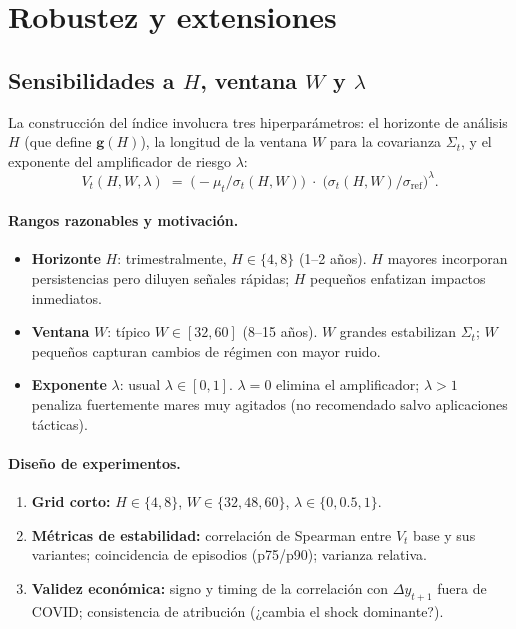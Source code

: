 \documentclass[11pt,a4paper]{article}
\newcommand{\1}{\mathbf{1}}
\newcommand{\vect}[1]{\boldsymbol{#1}}
\begin{document}
\section{Robustez y extensiones}

\subsection{Sensibilidades a \texorpdfstring{$H$}{H}, ventana \texorpdfstring{$W$}{W} y \texorpdfstring{$\lambda$}{lambda}}

La construcción del índice involucra tres hiperparámetros: el horizonte de análisis $H$ (que define $\vect{g}(H)$), la longitud de la ventana $W$ para la covarianza $\Sigma_t$, y el exponente del amplificador de riesgo $\lambda$:
\[
V_t(H,W,\lambda) \;=\; \Big(-\mu_t/\sigma_t(H,W)\Big)\;\cdot\;\Big(\sigma_t(H,W)/\sigma_{\text{ref}}\Big)^{\lambda}.
\]

\paragraph{Rangos razonables y motivación.}
\begin{itemize}
  \item \textbf{Horizonte} $H$: trimestralmente, $H\in\{4,8\}$ (1--2 años). 
  $H$ mayores incorporan persistencias pero diluyen señales rápidas; $H$ pequeños enfatizan impactos inmediatos.
  \item \textbf{Ventana} $W$: típico $W\in[32,60]$ (8--15 años). 
  $W$ grandes estabilizan $\Sigma_t$; $W$ pequeños capturan cambios de régimen con mayor ruido.
  \item \textbf{Exponente} $\lambda$: usual $\lambda\in[0,1]$. 
  $\lambda=0$ elimina el amplificador; $\lambda>1$ penaliza fuertemente mares muy agitados (no recomendado salvo aplicaciones tácticas).
\end{itemize}

\paragraph{Diseño de experimentos.}
\begin{enumerate}
  \item \textbf{Grid corto:} $H\in\{4,8\}$, $W\in\{32,48,60\}$, $\lambda\in\{0,0.5,1\}$.
  \item \textbf{Métricas de estabilidad:} correlación de Spearman entre $V_t$ base y sus variantes; coincidencia de episodios (p75/p90); varianza relativa.
  \item \textbf{Validez económica:} signo y timing de la correlación con $\Delta y_{t+1}$ fuera de COVID; consistencia de atribución (¿cambia el shock dominante?).
\end{enumerate}
\end{document}
